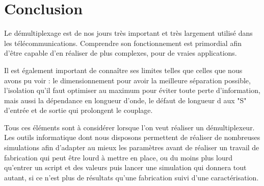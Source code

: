 \documentclass[a4paper,11pt]{report}
\begin{document}
\chapter*{Conclusion}

Le démultiplexage est de nos jours très important et très largement utilisé dans les télécommunications. Comprendre son fonctionnement est primordial afin d'être capable d'en réaliser de plus complexes, pour de vraies applications.

Il est également important de connaître ses limites telles que celles que nous avons pu voir : le dimensionnement pour avoir la meilleure séparation possible, l'isolation qu'il faut optimiser au maximum pour éviter toute perte d'information, mais aussi la dépendance en longueur d'onde, le défaut de longueur d aux "S" d'entrée et de sortie qui prolongent le couplage.

Tous ces éléments sont à considérer lorsque l'on veut réaliser un démultiplexeur. Les outils informatique dont nous disposons permettent de réaliser de nombreuses simulations afin d'adapter au mieux les paramètres avant de réaliser un travail de fabrication qui peut être lourd à mettre en place, ou du moins plus lourd qu'entrer un script et des valeurs puis lancer une simulation qui donnera tout autant, si ce n'est plus de résultats qu'une fabrication suivi d'une caractérisation. 

\nocite{*}


\end{document}
